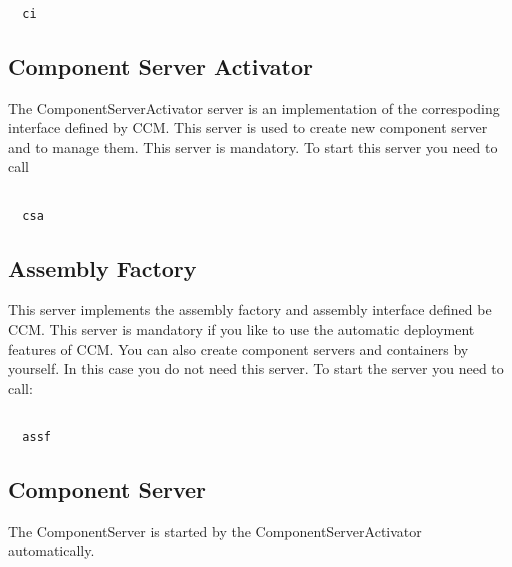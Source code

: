 \documentclass[12pt,a4paper]{report}
\begin{document}
\small
\begin{verbatim}

  ci

\end{verbatim}
\normalsize

\subsection{Component Server Activator}
\label{sec:ComponentServerActivator}

The ComponentServerActivator server is an implementation of the correspoding interface defined by CCM. This server is used to create new component server and to manage them. This server is mandatory. To start this server you need to call 

\small
\begin{verbatim}

  csa

\end{verbatim}
\normalsize

\subsection{Assembly Factory}
\label{sec:AssemblyFactory}

This server implements the assembly factory and assembly interface defined be CCM. This server is mandatory if you like to use the automatic deployment features of CCM. You can also create component servers and containers by yourself. In this case you do not need this server. To start the server you need to call:

\small
\begin{verbatim}

  assf

\end{verbatim}
\normalsize

\subsection{Component Server}
\label{sec:ComponentServer}

The ComponentServer is started by the ComponentServerActivator automatically.
\end{document}
